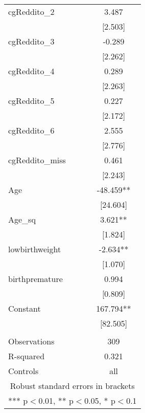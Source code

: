 \documentclass[]{article}
\begin{document}
\begin{tabular}{lc}
cgReddito\_2 & 3.487 \\
 & [2.503] \\
cgReddito\_3 & -0.289 \\
 & [2.262] \\
cgReddito\_4 & 0.289 \\
 & [2.263] \\
cgReddito\_5 & 0.227 \\
 & [2.172] \\
cgReddito\_6 & 2.555 \\
 & [2.776] \\
cgReddito\_miss & 0.461 \\
 & [2.243] \\
Age & -48.459** \\
 & [24.604] \\
Age\_sq & 3.621** \\
 & [1.824] \\
lowbirthweight & -2.634** \\
 & [1.070] \\
birthpremature & 0.994 \\
 & [0.809] \\
Constant & 167.794** \\
 & [82.505] \\
 &  \\
Observations & 309 \\
R-squared & 0.321 \\
 Controls & all \\ \hline
\multicolumn{2}{c}{ Robust standard errors in brackets} \\
\multicolumn{2}{c}{ *** p$<$0.01, ** p$<$0.05, * p$<$0.1} \\
\end{tabular}
\end{document}
